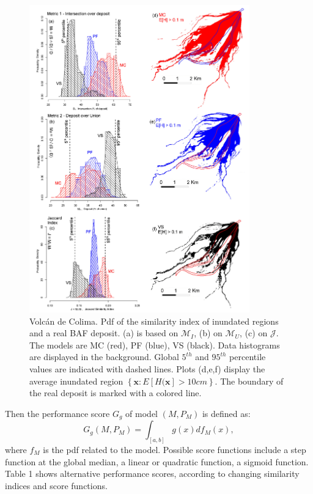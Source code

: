 \documentclass{article}
\begin{document}
\begin{figure}[H]
         \centering
        \includegraphics[width=0.85\textwidth]{figures/Colima/Histograms.jpg}
        \caption{Volc{\'a}n de Colima. Pdf of the similarity index of inundated regions and a real BAF deposit. (a) is based on $\mathcal M_I$, (b) on $\mathcal M_U$, (c) on $\mathcal J$. The models are MC (red), PF (blue), VS (black). Data histograms are displayed in the background. Global $5^{th}$ and $95^{th}$ percentile values are indicated with dashed lines. Plots (d,e,f) display the average inundated region $\left\{\textbf{x} : E[H(\textbf{x}]>10 cm\right\}$. The boundary of the real deposit is marked with a colored line.}\label{fig:Colima-Hist}
\end{figure}

Then the performance score $G_g$ of model $\left(M, P_M\right)$ is defined as:
$$G_g\left(M, P_M\right)=\int_{[a,b]} g(x) df_M(x),$$
where $f_M$ is the pdf related to the model. Possible score functions include a step function at the global median, a linear or quadratic function, a sigmoid function. Table 1 shows alternative performance scores, according to changing similarity indices and score functions.
\end{document}
